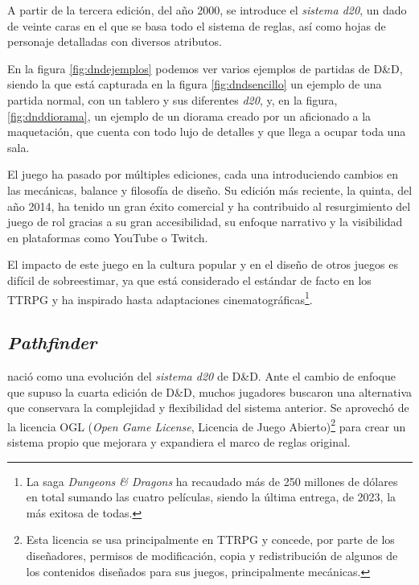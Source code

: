 \smallskip

A partir de la tercera edición, del año 2000, se introduce el \textit{sistema d20}, un dado de veinte caras en el que se basa todo el sistema de reglas, así como hojas de personaje detalladas con diversos atributos.

\medskip

En la figura \ref{fig:dndejemplos} podemos ver varios ejemplos de partidas de D\&D, siendo la que está capturada en la figura \ref{fig:dndsencillo} un ejemplo de una partida normal, con un tablero y sus diferentes \textit{d20}, y, en la figura, \ref{fig:dnddiorama}, un ejemplo de un diorama creado por un aficionado a la maquetación, que cuenta con todo lujo de detalles y que llega a ocupar toda una sala.

\medskip

El juego ha pasado por múltiples ediciones, cada una introduciendo cambios en las mecánicas, balance y filosofía de diseño. Su edición más reciente, la quinta, del año 2014, ha tenido un gran éxito comercial y ha contribuido al resurgimiento del juego de rol gracias a su gran accesibilidad, su enfoque narrativo y la visibilidad en plataformas como YouTube o Twitch.

\medskip

El impacto de este juego en la cultura popular y en el diseño de otros juegos es difícil de sobreestimar, ya que está considerado el estándar de facto en los TTRPG y ha inspirado hasta adaptaciones cinematográficas\footnote{La saga \textit{Dungeons \& Dragons} \citep{dndpeli} ha recaudado más de 250 millones de dólares en total sumando las cuatro películas, siendo la última entrega, de 2023, la más exitosa de todas.}.

\subsection{\textit{Pathfinder}}
\cite{pathfinder} nació como una evolución del \textit{sistema d20} de D\&D. Ante el cambio de enfoque que supuso la cuarta edición de D\&D, muchos jugadores buscaron una alternativa que conservara la complejidad y flexibilidad del sistema anterior. Se aprovechó de la licencia OGL (\textit{Open Game License}, Licencia de Juego Abierto)\footnote{Esta licencia se usa principalmente en TTRPG y concede, por parte de los diseñadores, permisos de modificación, copia y redistribución de algunos de los contenidos diseñados para sus juegos, principalmente mecánicas.} para crear un sistema propio que mejorara y expandiera el marco de reglas original.

